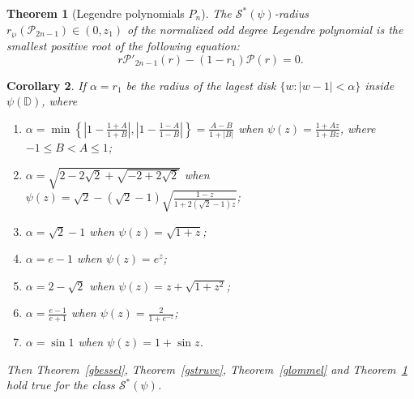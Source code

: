 \documentclass[12pt, reqno]{amsart}
\numberwithin{equation}{section}
\theoremstyle{plain}
\newtheorem{theorem}{Theorem}[section]
\newtheorem{corollary}[theorem]{Corollary}
\theoremstyle{definition}
\theoremstyle{remark}
\begin{document}
\begin{theorem}[Legendre polynomials $P_{n}$]\label{glegendre}
	The $\mathcal{S}^*(\psi)$-radius $r_{\wp}(\mathcal{P}_{2n-1})\in (0,z_1)$ of the normalized odd degree Legendre polynomial is the smallest positive root of the following equation:
	\begin{equation*}
	r\mathcal{P}'_{2n-1}(r)-(1-{r_1})\mathcal{P}(r)=0.
	\end{equation*}		
\end{theorem}

\begin{corollary}
	If $\alpha=r_1$ be the radius of the lagest disk $\{w: |w-1|< \alpha\}$ inside $\psi(\mathbb{D})$, where
	\begin{enumerate}[$(i)$]
		\item   	$\alpha=\min\left\{\left|1-\frac{1+A}{1+B}\right|, \left|1-\frac{1-A}{1-B}\right|\right\}=\frac{A-B}{1+|B|}$ when $\psi(z)= \frac{1+Az}{1+Bz}$, where $-1\leq B<A\leq1$;
		
		\item  	$\alpha=\sqrt{2-2\sqrt{2}+\sqrt{-2+2\sqrt{2}}}$ when  $\psi(z)=\sqrt{2}-(\sqrt{2}-1)\sqrt{\frac{1-z}{1+2(\sqrt{2}-1)z}}$;
		
		\item  	$\alpha=\sqrt{2}-1$ when $\psi(z)=\sqrt{1+z}$;
		
		\item  $\alpha=e-1$ when $\psi(z)=e^z$;
		
		\item  $\alpha=2-\sqrt{2}$ when $\psi(z)=z+\sqrt{1+z^2}$;
		
		\item  $\alpha=\frac{e-1}{e+1}$ when $\psi(z)=\frac{2}{1+e^{-z}}$;
		
		\item   $\alpha=\sin{1}$ when $\psi(z)=1+\sin{z}$.
		
	\end{enumerate}
	Then Theorem~\ref{gbessel}, Theorem~\ref{gstruve}, Theorem~\ref{glommel} and Theorem~\ref{glegendre} hold true for the class 
	$\mathcal{S}^{*}(\psi)$.
\end{corollary}

%
\end{document}
